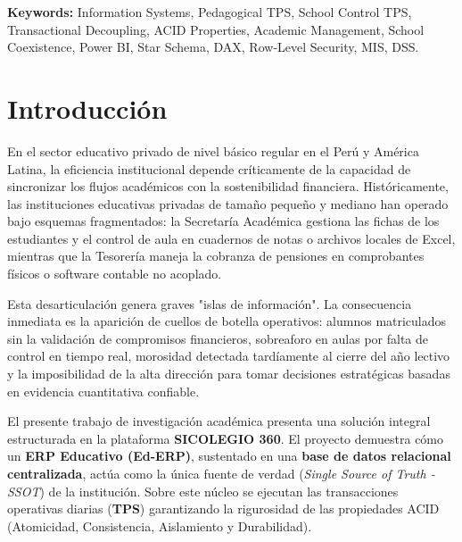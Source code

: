 \documentclass[12pt,a4paper,oneside]{report}
\begin{document}
    \textbf{Keywords:} Information Systems, Pedagogical TPS, School Control TPS, Transactional Decoupling, ACID Properties, Academic Management, School Coexistence, Power BI, Star Schema, DAX, Row-Level Security, MIS, DSS.

    \newpage 
    \tableofcontents
    \newpage
    \listoftables
    \newpage
    \listoffigures

    \chapter*{Introducción}

    En el sector educativo privado de nivel básico regular en el Perú y América Latina, la eficiencia institucional depende críticamente de la capacidad de sincronizar los flujos académicos con la sostenibilidad financiera. Históricamente, las instituciones educativas privadas de tamaño pequeño y mediano han operado bajo esquemas fragmentados: la Secretaría Académica gestiona las fichas de los estudiantes y el control de aula en cuadernos de notas o archivos locales de Excel, mientras que la Tesorería maneja la cobranza de pensiones en comprobantes físicos o software contable no acoplado.

    Esta desarticulación genera graves "islas de información". La consecuencia inmediata es la aparición de cuellos de botella operativos: alumnos matriculados sin la validación de compromisos financieros, sobreaforo en aulas por falta de control en tiempo real, morosidad detectada tardíamente al cierre del año lectivo y la imposibilidad de la alta dirección para tomar decisiones estratégicas basadas en evidencia cuantitativa confiable.

    El presente trabajo de investigación académica presenta una solución integral estructurada en la plataforma \textbf{SICOLEGIO 360}. El proyecto demuestra cómo un \textbf{ERP Educativo (Ed-ERP)}, sustentado en una \textbf{base de datos relacional centralizada}, actúa como la única fuente de verdad (\textit{Single Source of Truth - SSOT}) de la institución. Sobre este núcleo se ejecutan las transacciones operativas diarias (\textbf{TPS}) garantizando la rigurosidad de las propiedades ACID (Atomicidad, Consistencia, Aislamiento y Durabilidad).
\end{document}
